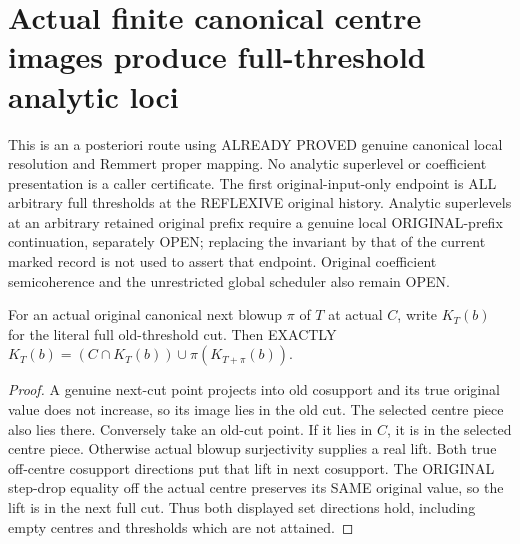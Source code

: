 \section{Actual finite canonical centre images produce full-threshold analytic loci}

This is an a posteriori route using ALREADY PROVED genuine canonical local
resolution and Remmert proper mapping. No analytic superlevel or coefficient
presentation is a caller certificate. The first original-input-only endpoint
is ALL arbitrary full thresholds at the REFLEXIVE original history. Analytic
superlevels at an arbitrary retained original prefix require a genuine local
ORIGINAL-prefix continuation, separately OPEN; replacing the invariant by
that of the current marked record is not used to assert that endpoint.
Original coefficient semicoherence and the unrestricted global scheduler
also remain OPEN.

\begin{lemma}
\label{hir:original-canonical-step-full-cut-centre-image-dictionary}
\leanok
For an actual original canonical next blowup $\pi$ of $T$ at actual $C$,
write $K_T(b)$ for the literal full old-threshold cut. Then EXACTLY
$K_T(b)=(C\cap K_T(b))\cup\pi(K_{T+\pi}(b))$.
\end{lemma}
\begin{proof}
A genuine next-cut point projects into old cosupport and its true original
value does not increase, so its image lies in the old cut. The selected
centre piece also lies there. Conversely take an old-cut point. If it lies
in $C$, it is in the selected centre piece. Otherwise actual blowup
surjectivity supplies a real lift. Both true off-centre cosupport directions
put that lift in next cosupport. The ORIGINAL step-drop equality off the
actual centre preserves its SAME original value, so the lift is in the
next full cut. Thus both displayed set directions hold, including empty
centres and thresholds which are not attained.
\end{proof}

